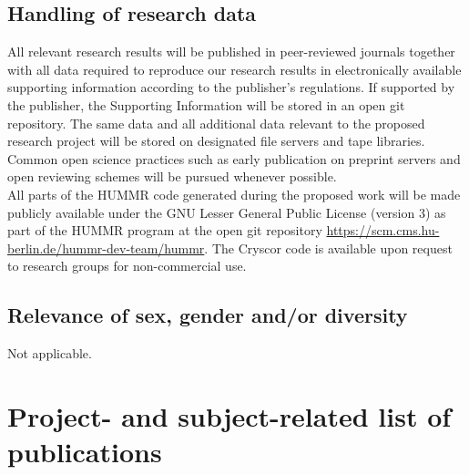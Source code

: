 \documentclass[a4paper,11pt,headings=normal]{scrartcl}
\newcommand{\bhl}{\color{blue}}
\newcommand{\ehl}{\color{black}}
\begin{document}
\subsection{Handling of research data}
\vspace{-1em}
All relevant research results will be published in peer-reviewed journals 
together with all data required to reproduce our research results in 
electronically available supporting information according to the publisher's 
regulations. If supported by the publisher, the Supporting Information will be 
stored in an open git repository.
The same data and all additional data relevant to the proposed 
research project will be stored on designated file servers and tape libraries. 
Common open science practices such as early publication on preprint servers and open reviewing schemes will be pursued whenever possible.\\
All parts of the HUMMR code generated during the proposed work will be made 
publicly available under the GNU Lesser General Public License (version 3) as 
part of the HUMMR program at the open git repository 
\bhl \underline{https://scm.cms.hu-berlin.de/hummr-dev-team/hummr}\ehl. 
The Cryscor code is available upon request to research groups for 
non-commercial use.\\
\vspace{-2em}

\subsection{Relevance of sex, gender and/or diversity}
\vspace{-1em}
Not applicable.
\vspace{-1em}

\section{Project- and subject-related list of publications}
\vspace{-1em}
\setlength{}
\AtNextBibliography{\footnotesize}
\printbibliography[heading=none]
\newpage
\end{document}

